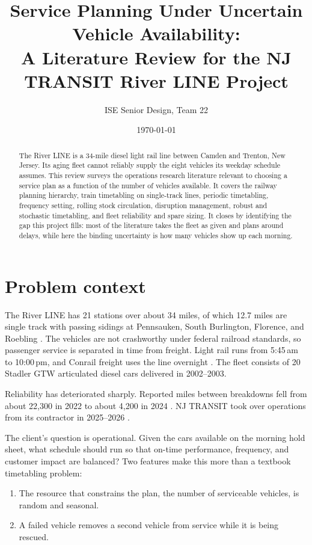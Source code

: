 \documentclass[11pt]{article}
\title{Service Planning Under Uncertain Vehicle Availability:\\
A Literature Review for the NJ TRANSIT River LINE Project}
\author{ISE Senior Design, Team 22}
\date{\today}
\begin{document}
\maketitle

\begin{abstract}
The River LINE is a 34-mile diesel light rail line between Camden and Trenton, New Jersey. Its aging fleet cannot reliably supply the eight vehicles its weekday schedule assumes. This review surveys the operations research literature relevant to choosing a service plan as a function of the number of vehicles available. It covers the railway planning hierarchy, train timetabling on single-track lines, periodic timetabling, frequency setting, rolling stock circulation, disruption management, robust and stochastic timetabling, and fleet reliability and spare sizing. It closes by identifying the gap this project fills: most of the literature takes the fleet as given and plans around delays, while here the binding uncertainty is how many vehicles show up each morning.
\end{abstract}

\section{Problem context}

The River LINE has 21 stations over about 34 miles, of which 12.7 miles are single track with passing sidings at Pennsauken, South Burlington, Florence, and Roebling \citep{njdot2021riverline}. The vehicles are not crashworthy under federal railroad standards, so passenger service is separated in time from freight. Light rail runs from 5:45\,am to 10:00\,pm, and Conrail freight uses the line overnight \citep{njdot2021riverline}. The fleet consists of 20 Stadler GTW articulated diesel cars delivered in 2002--2003.

Reliability has deteriorated sharply. Reported miles between breakdowns fell from about 22{,}300 in 2022 to about 4{,}200 in 2024 \citep{roinj2025riverline}. NJ TRANSIT took over operations from its contractor in 2025--2026 \citep{njt2025alstom}.

The client's question is operational. Given the cars available on the morning hold sheet, what schedule should run so that on-time performance, frequency, and customer impact are balanced? Two features make this more than a textbook timetabling problem:
\begin{enumerate}
\item The resource that constrains the plan, the number of serviceable vehicles, is random and seasonal.
\item A failed vehicle removes a second vehicle from service while it is being rescued.
\end{enumerate}
\end{document}
